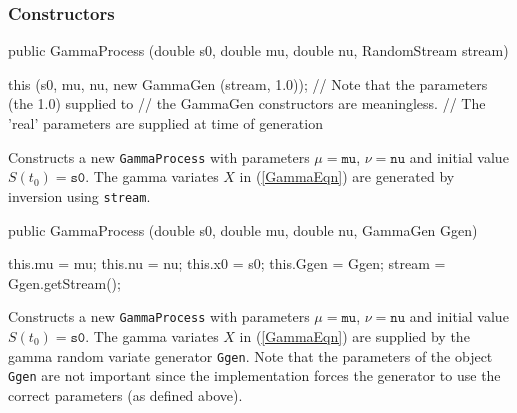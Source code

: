 \begin{code}
\begin{hide}
{   protected double setLarger (double[] path, int left, int right) {
      /* make sure that path[left] < s < path[right] by adding a
        small epsilon to the last two; return s. */
      double myEps;
      if (path[left] >= 0)
         myEps = EPS;
      else
         myEps = -EPS;
      double s = path[left] * (1.0 + myEps);
      if (s >= path[right])
         path[right] = s * (1.0 + myEps);
      return s;
   }


   protected double setLarger (double v) {
      /* return a number that is slightly larger than v */
      if (v >= 0)
         return v*(1.0 + EPS) + Num.DBL_EPSILON;
      else
         return v*(1.0 - EPS);
    }\end{hide}
\end{code}
\subsubsection* {Constructors}
\begin{code}

   public GammaProcess (double s0, double mu, double nu,
                        RandomStream stream)\begin{hide} {
        this (s0, mu, nu,  new GammaGen (stream, 1.0));
// Note that the parameters (the 1.0) supplied to
// the GammaGen constructors are meaningless.
// The 'real' parameters are supplied at time of generation
    }\end{hide}
\end{code}
\begin{tabb} Constructs a new \texttt{GammaProcess} with parameters $\mu =
\texttt{mu}$, $\nu = \texttt{nu}$ and initial value $S(t_{0}) = \texttt{s0}$.
The gamma variates $X$ in (\ref{GammaEqn}) are generated by inversion
using \texttt{stream}.
\end{tabb}
\begin{code}

   public GammaProcess (double s0, double mu, double nu, GammaGen Ggen) \begin{hide} {
        this.mu    = mu;
        this.nu    = nu;
        this.x0    = s0;
        this.Ggen     = Ggen;
        stream = Ggen.getStream();
    }\end{hide}
\end{code}
\begin{tabb} Constructs a new \texttt{GammaProcess} with parameters $\mu =
\texttt{mu}$, $\nu = \texttt{nu}$ and initial value $S(t_{0}) = \texttt{s0}$.
The gamma variates $X$ in (\ref{GammaEqn}) are supplied by the gamma random
variate generator \texttt{Ggen}. Note that the parameters of the
 object
\texttt{Ggen} are not important since the implementation forces the generator
to use the correct parameters (as defined above).
\end{tabb}



